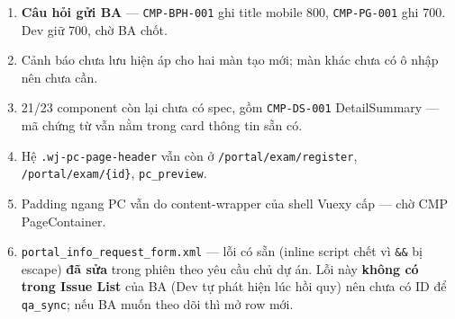 \begin{enumerate}
\item \textbf{Câu hỏi gửi BA} --- \texttt{CMP-BPH-001} ghi title mobile 800,
  \texttt{CMP-PG-001} ghi 700. Dev giữ 700, chờ BA chốt.
\item Cảnh báo chưa lưu hiện áp cho hai màn tạo mới; màn khác chưa có ô nhập nên chưa cần.
\item 21/23 component còn lại chưa có spec, gồm \texttt{CMP-DS-001} DetailSummary --- mã
  chứng từ vẫn nằm trong card thông tin sẵn có.
\item Hệ \texttt{.wj-pc-page-header} vẫn còn ở \texttt{/portal/exam/register},
  \texttt{/portal/exam/\{id\}}, \texttt{pc\_preview}.
\item Padding ngang PC vẫn do content-wrapper của shell Vuexy cấp --- chờ CMP PageContainer.
\item \texttt{portal\_info\_request\_form.xml} --- lỗi có sẵn (inline script chết vì
  \texttt{\&\&} bị escape) \textbf{đã sửa} trong phiên theo yêu cầu chủ dự án. Lỗi này
  \textbf{không có trong Issue List} của BA (Dev tự phát hiện lúc hồi quy) nên chưa có ID để
  \texttt{qa\_sync}; nếu BA muốn theo dõi thì mở row mới.
\end{enumerate}
